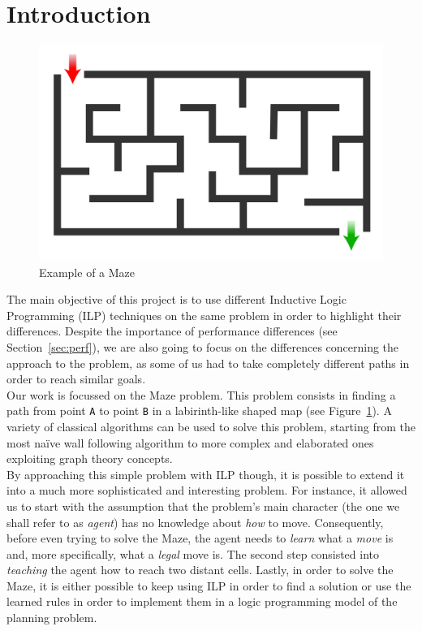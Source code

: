 \section{Introduction}\label{sec:intro}

\begin{figure}[b]
    \centering
    \includegraphics[scale=0.1]{img/Maze_simple.svg.png}
    \caption{Example of a Maze}\label{fig:fig1}
\end{figure}

The main objective of this project is to use different Inductive Logic Programming (ILP) techniques on the same problem in order to highlight
their differences. Despite the importance of performance differences (see Section~\ref{sec:perf}), we are also going to focus on the differences
concerning the approach to the problem, as some of us had to take completely different paths in order to reach similar goals.\\

Our work is focussed on the Maze problem. This problem consists in finding a path from point \texttt{A}
to point \texttt{B} in a labirinth-like shaped map (see Figure~\ref{fig:fig1}). A variety of classical algorithms
can be used to solve this problem, starting from the most naïve wall following algorithm to more complex and elaborated
ones exploiting graph theory concepts.\\
By approaching this simple problem with ILP though, it is possible to extend it into a much more sophisticated and interesting
problem. For instance, it allowed us to start with the assumption that the problem's main character (the
one we shall refer to as \emph{agent}) has no knowledge about \emph{how} to move. Consequently, before even trying
to solve the Maze, the agent needs to \emph{learn} what a \emph{move} is and, more specifically, what a \emph{legal} move is. The second
step consisted into \emph{teaching} the agent how to reach two distant cells. Lastly, in order to solve the Maze, it is either possible
to keep using ILP in order to find a solution or use the learned rules in order to implement them in a logic programming model of the planning
problem.\\